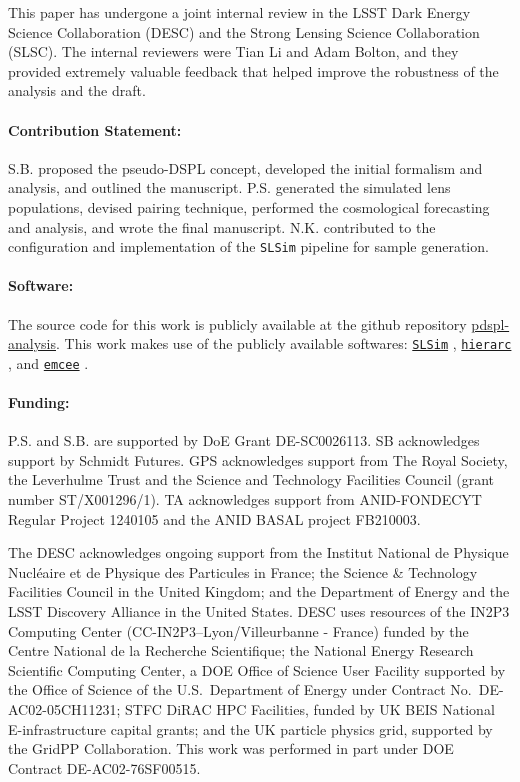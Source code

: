 \documentclass[a4paper,11pt]{article}
\begin{document}
\acknowledgments

This paper has undergone a joint internal review in the LSST Dark Energy Science Collaboration (DESC) and the Strong Lensing Science Collaboration (SLSC). The internal reviewers were Tian Li and Adam Bolton, and they provided extremely valuable feedback that helped improve the robustness of the analysis and the draft.

\paragraph{Contribution Statement:}S.B. proposed the pseudo-DSPL concept, developed the initial formalism and analysis, and outlined the manuscript. P.S. generated the simulated lens populations, devised pairing technique, performed the cosmological forecasting and analysis, and wrote the final manuscript. N.K. contributed to the configuration and implementation of the \texttt{SLSim} pipeline for sample generation. 

\paragraph{Software:}The source code for this work is publicly available at the github repository \href{https://github.com/timedilatesme/pdspl-analysis/tree/draft_Post_DESC_CWR_24-06-2026}{pdspl-analysis}. This work makes use of the publicly available softwares: \href{https://github.com/LSST-strong-lensing/slsim}{\texttt{SLSim}} \cite{Khadka:2026}, \href{https://github.com/sibirrer/hierArc}{\texttt{hierarc}} \citep{Birrer:2020}, and \href{https://github.com/dfm/emcee}{\texttt{emcee}} \citep{emcee}.

\paragraph{Funding:}P.S. and S.B. are supported by DoE Grant DE-SC0026113. SB acknowledges support by Schmidt Futures. GPS acknowledges support from The Royal Society, the Leverhulme Trust and the Science and Technology Facilities Council (grant number ST/X001296/1). TA acknowledges support from ANID-FONDECYT Regular Project 1240105 and the ANID BASAL project FB210003.


The DESC acknowledges ongoing support from the Institut National de 
Physique Nucl\'eaire et de Physique des Particules in France; the 
Science \& Technology Facilities Council in the United Kingdom; and the
Department of Energy and the LSST Discovery Alliance
in the United States.  DESC uses resources of the IN2P3 
Computing Center (CC-IN2P3--Lyon/Villeurbanne - France) funded by the 
Centre National de la Recherche Scientifique; the National Energy 
Research Scientific Computing Center, a DOE Office of Science User 
Facility supported by the Office of Science of the U.S.\ Department of
Energy under Contract No.\ DE-AC02-05CH11231; STFC DiRAC HPC Facilities, 
funded by UK BEIS National E-infrastructure capital grants; and the UK 
particle physics grid, supported by the GridPP Collaboration.  This 
work was performed in part under DOE Contract DE-AC02-76SF00515.
\end{document}
